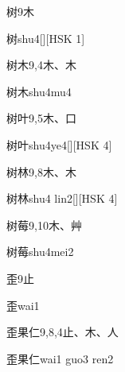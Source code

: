 \begin{Entry}{树}{9}{⽊}
  \begin{Phonetics}{树}{shu4}[][HSK 1]
  \end{Phonetics}
\end{Entry}

\begin{Entry}{树木}{9,4}{⽊、⽊}
  \begin{Phonetics}{树木}{shu4mu4}
  \end{Phonetics}
\end{Entry}

\begin{Entry}{树叶}{9,5}{⽊、⼝}
  \begin{Phonetics}{树叶}{shu4ye4}[][HSK 4]
  \end{Phonetics}
\end{Entry}

\begin{Entry}{树林}{9,8}{⽊、⽊}
  \begin{Phonetics}{树林}{shu4 lin2}[][HSK 4]
  \end{Phonetics}
\end{Entry}

\begin{Entry}{树莓}{9,10}{⽊、⾋}
  \begin{Phonetics}{树莓}{shu4mei2}
  \end{Phonetics}
\end{Entry}

\begin{Entry}{歪}{9}{⽌}
  \begin{Phonetics}{歪}{wai1}
  \end{Phonetics}
\end{Entry}

\begin{Entry}{歪果仁}{9,8,4}{⽌、⽊、⼈}
  \begin{Phonetics}{歪果仁}{wai1 guo3 ren2}
  \end{Phonetics}
\end{Entry}

